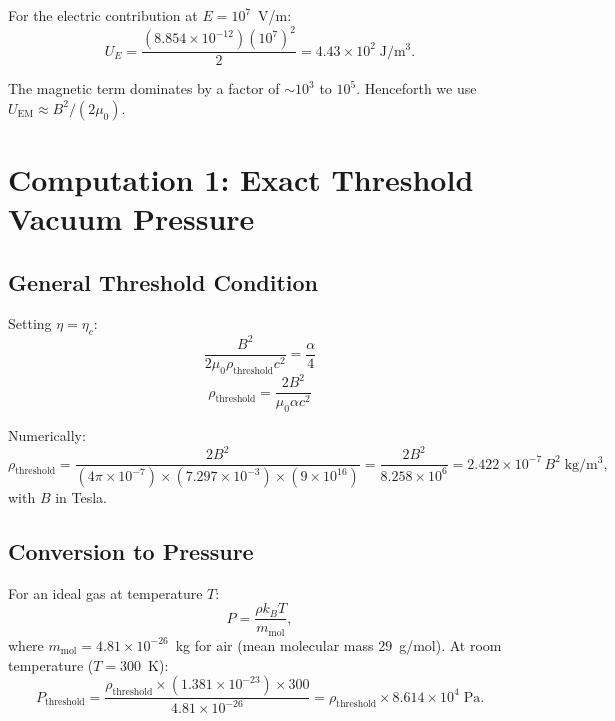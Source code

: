 \documentclass[11pt,a4paper]{article}
\begin{document}
For the electric contribution at $E = 10^7$~V/m:
\begin{equation}
U_E = \frac{(8.854 \times 10^{-12})(10^7)^2}{2} = 4.43 \times 10^2\;\mathrm{J/m^3}.
\end{equation}

The magnetic term dominates by a factor of $\sim 10^3$ to $10^5$. Henceforth we
use $U_{\mathrm{EM}} \approx B^2/(2\mu_0)$.

\section{Computation 1: Exact Threshold Vacuum Pressure}\label{sec:threshold}

\subsection{General Threshold Condition}

Setting $\eta = \eta_c$:
\begin{equation}
\frac{B^2}{2\mu_0 \rho_{\mathrm{threshold}} c^2} = \frac{\alpha}{4}
\end{equation}
\begin{equation}\label{eq:rho_thresh}
\boxed{\rho_{\mathrm{threshold}} = \frac{2 B^2}{\mu_0 \alpha c^2}}
\end{equation}

Numerically:
\begin{equation}
\rho_{\mathrm{threshold}} = \frac{2 B^2}{(4\pi \times 10^{-7}) \times (7.297 \times 10^{-3})
\times (9 \times 10^{16})}
= \frac{2 B^2}{8.258 \times 10^6} = 2.422 \times 10^{-7}\,B^2\;\mathrm{kg/m^3},
\end{equation}
with $B$ in Tesla.

\subsection{Conversion to Pressure}

For an ideal gas at temperature $T$:
\begin{equation}
P = \frac{\rho k_B T}{m_{\mathrm{mol}}},
\end{equation}
where $m_{\mathrm{mol}} = 4.81 \times 10^{-26}$~kg for air (mean molecular mass 29~g/mol).
At room temperature ($T = 300$~K):
\begin{equation}
P_{\mathrm{threshold}} = \frac{\rho_{\mathrm{threshold}} \times (1.381 \times 10^{-23}) \times 300}
{4.81 \times 10^{-26}} = \rho_{\mathrm{threshold}} \times 8.614 \times 10^4\;\mathrm{Pa}.
\end{equation}
\end{document}
